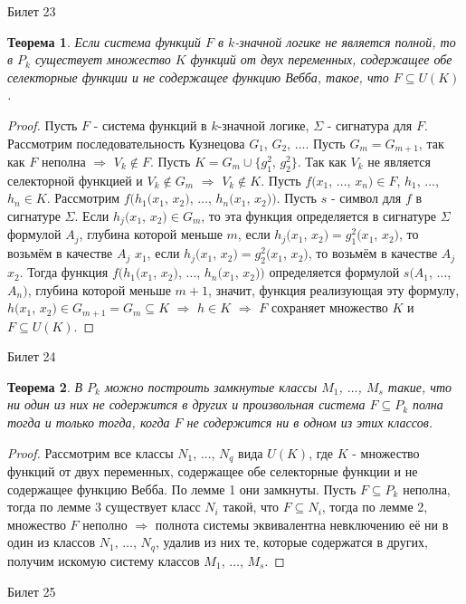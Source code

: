 \documentclass[a4paper, 12pt]{article}
\theoremstyle{definition}
\theoremstyle{plain}
\newtheorem*{theorem}{Теорема}
\theoremstyle{remark}
\begin{document}
  \begin{center}
    Билет 23
  \end{center}
  \begin{theorem}
    Если система функций $F$ в $k$-значной логике не является полной, то в $P_k$ существует множество $K$ функций от двух переменных, содержащее обе селекторные функции и не содержащее функцию Вебба, такое, что $F\subseteq  U(K)$.
  \end{theorem}
  \begin{proof}
    Пусть $F$ - система функций в $k$-значной логике, $\Sigma$ - сигнатура для $F$. Рассмотрим последовательность Кузнецова $G_1$, $G_2$, $\ldots$. Пусть $G_m=G_{m+1}$, так как $F$ неполна $\Longrightarrow$ $V_k\notin F$. Пусть $K=G_m\cup \{g_1^2$, $g_2^2\}$. Так как $V_k$ не является селекторной функцией и $V_k\notin G_m$ $\Longrightarrow$ $V_k\notin K$. Пусть $f(x_1$, $\ldots$, $x_n)\in F$, $h_1$, $\ldots$, $h_n\in K$. Рассмотрим $f(h_1(x_1$, $x_2)$, $\ldots$, $h_n(x_1$, $x_2))$. Пусть $s$ - символ для $f$ в сигнатуре $\Sigma$. Если $h_j(x_1$, $x_2)\in G_m$, то эта функция определяется в сигнатуре $\Sigma$ формулой $A_j$, глубина которой меньше $m$, если $h_j(x_1$, $x_2)=g_1^2(x_1$, $x_2)$, то возьмём в качестве $A_j$ $x_1$, если $h_j(x_1$, $x_2)=g_2^2(x_1$, $x_2)$, то возьмём в качестве $A_j$ $x_2$. Тогда функция $f(h_1(x_1$, $x_2)$, $\ldots$, $h_n(x_1$, $x_2))$ определяется формулой $s(A_1$, $\ldots$, $A_n)$, глубина которой меньше $m+1$, значит, функция реализующая эту формулу, $h(x_1$, $x_2)\in G_{m+1}=G_m\subseteq K$ $\Longrightarrow$ $h\in K$ $\Longrightarrow$ $F$ сохраняет множество $K$ и $F\subseteq U(K)$.
  \end{proof}
  \begin{center}
    Билет 24
  \end{center}
  \begin{theorem}
    В $P_k$ можно построить замкнутые классы $M_1$, $\ldots$, $M_s$ такие, что ни один из них не содержится в других и произвольная система $F\subseteq P_k$ полна тогда и только тогда, когда $F$ не содержится ни в одном из этих классов.
  \end{theorem}
  \begin{proof}
    Рассмотрим все классы $N_1$, $\ldots$, $N_q$ вида $U(K)$, где $K$ - множество функций от двух переменных, содержащее обе селекторные функции и не содержащее функцию Вебба. По лемме 1 они замкнуты. Пусть $F\subseteq P_k$ неполна, тогда по лемме 3 существует класс $N_i$  такой, что $F\subseteq N_i$, тогда по лемме 2, множество $F$ неполно $\Longrightarrow$ полнота системы эквивалентна невключению её ни в один из классов $N_1$, $\ldots$, $N_q$, удалив из них те, которые содержатся в других, получим искомую систему классов $M_1$, $\ldots$, $M_s$.
  \end{proof}
  \begin{center}
    Билет 25
  \end{center}
\end{document}
